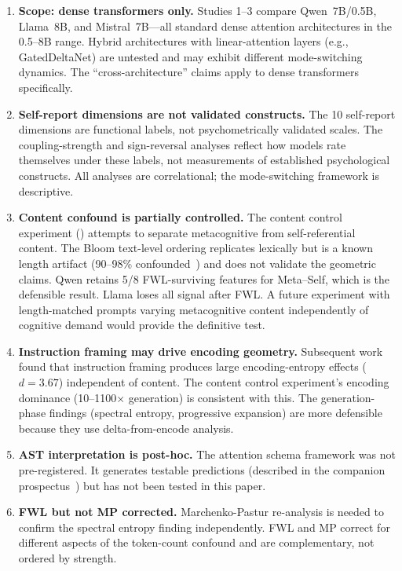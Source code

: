 \documentclass[11pt,a4paper]{article}
\begin{document}
\begin{enumerate}
    \item \textbf{Scope: dense transformers only.} Studies 1--3 compare Qwen~7B/0.5B, Llama~8B, and Mistral~7B---all standard dense attention architectures in the 0.5--8B range. Hybrid architectures with linear-attention layers (e.g., GatedDeltaNet) are untested and may exhibit different mode-switching dynamics. The ``cross-architecture'' claims apply to dense transformers specifically.

    \item \textbf{Self-report dimensions are not validated constructs.} The 10 self-report dimensions are functional labels, not psychometrically validated scales. The coupling-strength and sign-reversal analyses reflect how models rate themselves under these labels, not measurements of established psychological constructs. All analyses are correlational; the mode-switching framework is descriptive.

    \item \textbf{Content confound is partially controlled.} The content control experiment () attempts to separate metacognitive from self-referential content. The Bloom text-level ordering replicates lexically but is a known length artifact (90--98\% confounded~\citep{lyra2026campaign3}) and does not validate the geometric claims. Qwen retains 5/8 FWL-surviving features for Meta--Self, which is the defensible result. Llama loses all signal after FWL. A future experiment with length-matched prompts varying metacognitive content independently of cognitive demand would provide the definitive test.

    \item \textbf{Instruction framing may drive encoding geometry.} Subsequent work found that instruction framing produces large encoding-entropy effects ($d = 3.67$) independent of content. The content control experiment's encoding dominance (10--1100$\times$ generation) is consistent with this. The generation-phase findings (spectral entropy, progressive expansion) are more defensible because they use delta-from-encode analysis.

    \item \textbf{AST interpretation is post-hoc.} The attention schema framework was not pre-registered. It generates testable predictions (described in the companion prospectus~\citep{lyra2026ast_experiments}) but has not been tested in this paper.

    \item \textbf{FWL but not MP corrected.} Marchenko-Pastur re-analysis is needed to confirm the spectral entropy finding independently. FWL and MP correct for different aspects of the token-count confound and are complementary, not ordered by strength.
\end{enumerate}
\end{document}
